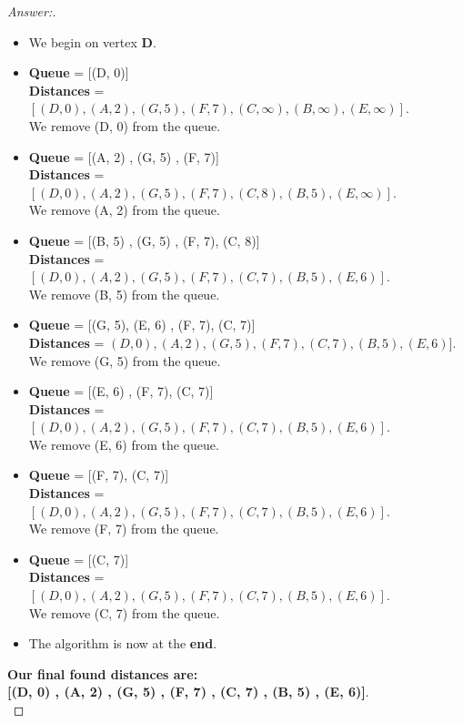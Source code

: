 \documentclass[11pt]{article}
\theoremstyle{definition}
\theoremstyle{definition}
\theoremstyle{definition}
\begin{document}
\begin{proof}[Answer:] \
\begin{itemize}
\item We begin on vertex \textbf{D}.
\item \textbf{Queue} = [\color{red}(D, 0)\color{black}] \\ \textbf{Distances} = $[(D, 0) , (A, 2) , (G, 5) , (F, 7) , (C, \infty) , (B, \infty) , (E, \infty)]$. \\ We remove (D, 0) from the queue.
\item \textbf{Queue} = [\color{red}(A, 2)\color{black} , (G, 5) , (F, 7)] \\ \textbf{Distances} = $[(D, 0) , (A, 2) , (G, 5) , (F, 7) , (C, 8) , (B, 5) , (E, \infty)]$. \\ We remove (A, 2) from the queue.
\item \textbf{Queue} = [\color{red}(B, 5)\color{black} , (G, 5) , (F, 7), (C, 8)] \\ \textbf{Distances} = $[(D, 0) , (A, 2) , (G, 5) , (F, 7) , (C, 7) , (B, 5) , (E, 6)]$. \\ We remove (B, 5) from the queue.
\item \textbf{Queue} = [\color{red}(G, 5)\color{black}, (E, 6) , (F, 7), (C, 7)] \\ \textbf{Distances} = $(D, 0) , (A, 2) , (G, 5) , (F, 7) , (C, 7) , (B, 5) , (E, 6)]$. \\ We remove (G, 5) from the queue.
\item \textbf{Queue} = [\color{red}(E, 6)\color{black} , (F, 7), (C, 7)] \\ \textbf{Distances} = $[(D, 0) , (A, 2) , (G, 5) , (F, 7) , (C, 7) , (B, 5) , (E, 6)]$. \\ We remove (E, 6) from the queue.
\item \textbf{Queue} = [\color{red}(F, 7)\color{black}, (C, 7)] \\ \textbf{Distances} = $[(D, 0) , (A, 2) , (G, 5) , (F, 7) , (C, 7) , (B, 5) , (E, 6)]$. \\ We remove (F, 7) from the queue.
\item \textbf{Queue} = [\color{red}(C, 7)\color{black}] \\ \textbf{Distances} = $[(D, 0) , (A, 2) , (G, 5) , (F, 7) , (C, 7) , (B, 5) , (E, 6)]$. \\ We remove (C, 7) from the queue.
\item The algorithm is now at the \textbf{end}.
\end{itemize} 

\item \textbf{Our final found distances are:} \\ \textbf{[(D, 0) , (A, 2) , (G, 5) , (F, 7) , (C, 7) , (B, 5) , (E, 6)]}. \\

\end{proof}

\end{document}
